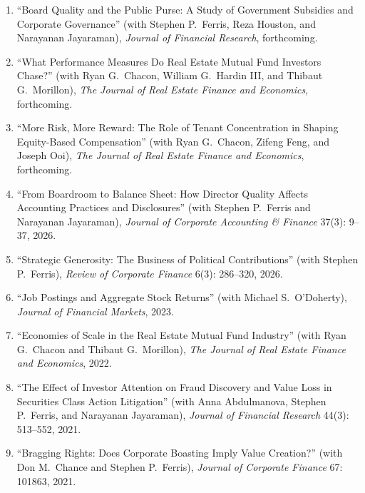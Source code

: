 \documentclass[letterpaper,11pt]{article}
\newcommand{\sectionspacing}{\vspace{-2mm}}
\begin{document}
\small{
\begin{enumerate}[leftmargin=*, labelsep=0.5em, itemsep=2pt]

\item ``Board Quality and the Public Purse: A Study of Government Subsidies and Corporate Governance'' (with Stephen P.\ Ferris, Reza Houston, and Narayanan Jayaraman), \textit{Journal of Financial Research}, forthcoming.

\item ``What Performance Measures Do Real Estate Mutual Fund Investors Chase?'' (with Ryan G.\ Chacon, William G.\ Hardin III, and Thibaut G.\ Morillon), \textit{The Journal of Real Estate Finance and Economics}, forthcoming.

\item ``More Risk, More Reward: The Role of Tenant Concentration in Shaping Equity-Based Compensation'' (with Ryan G.\ Chacon, Zifeng Feng, and Joseph Ooi), \textit{The Journal of Real Estate Finance and Economics}, forthcoming.

\item ``From Boardroom to Balance Sheet: How Director Quality Affects Accounting Practices and Disclosures'' (with Stephen P.\ Ferris and Narayanan Jayaraman), \textit{Journal of Corporate Accounting \& Finance} 37(3): 9--37, 2026.

\item ``Strategic Generosity: The Business of Political Contributions'' (with Stephen P.\ Ferris), \textit{Review of Corporate Finance} 6(3): 286--320, 2026.

\item ``Job Postings and Aggregate Stock Returns'' (with Michael S.\ O'Doherty), \textit{Journal of Financial Markets}, 2023.

\item ``Economies of Scale in the Real Estate Mutual Fund Industry'' (with Ryan G.\ Chacon and Thibaut G.\ Morillon), \textit{The Journal of Real Estate Finance and Economics}, 2022.

\item ``The Effect of Investor Attention on Fraud Discovery and Value Loss in Securities Class Action Litigation'' (with Anna Abdulmanova, Stephen P.\ Ferris, and Narayanan Jayaraman), \textit{Journal of Financial Research} 44(3): 513--552, 2021.

\item ``Bragging Rights: Does Corporate Boasting Imply Value Creation?'' (with Don M.\ Chance and Stephen P.\ Ferris), \textit{Journal of Corporate Finance} 67: 101863, 2021.

\end{enumerate}
}
\sectionspacing
\end{document}
